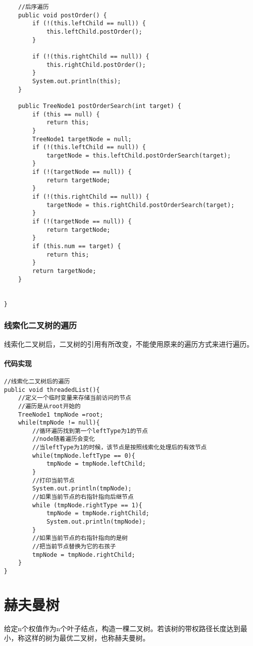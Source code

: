 \documentclass[a4paper]{report}
\begin{document}
\begin{lstlisting}
    //后序遍历
    public void postOrder() {
        if (!(this.leftChild == null)) {
            this.leftChild.postOrder();
        }

        if (!(this.rightChild == null)) {
            this.rightChild.postOrder();
        }
        System.out.println(this);
    }

    public TreeNode1 postOrderSearch(int target) {
        if (this == null) {
            return this;
        }
        TreeNode1 targetNode = null;
        if (!(this.leftChild == null)) {
            targetNode = this.leftChild.postOrderSearch(target);
        }
        if (!(targetNode == null)) {
            return targetNode;
        }
        if (!(this.rightChild == null)) {
            targetNode = this.rightChild.postOrderSearch(target);
        }
        if (!(targetNode == null)) {
            return targetNode;
        }
        if (this.num == target) {
            return this;
        }
        return targetNode;
    }


}
\end{lstlisting}
\subsection{线索化二叉树的遍历}
线索化二叉树后，二叉树的引用有所改变，不能使用原来的遍历方式来进行遍历。
\subsubsection{代码实现}
\begin{lstlisting}
//线索化二叉树后的遍历
public void threadedList(){
    //定义一个临时变量来存储当前访问的节点
    //遍历是从root开始的
    TreeNode1 tmpNode =root;
    while(tmpNode != null){
        //循环遍历找到第一个leftType为1的节点
        //node随着遍历会变化
        //当leftType为1的时候，该节点是按照线索化处理后的有效节点
        while(tmpNode.leftType == 0){
            tmpNode = tmpNode.leftChild;
        }
        //打印当前节点
        System.out.println(tmpNode);
        //如果当前节点的右指针指向后继节点
        while (tmpNode.rightType == 1){
            tmpNode = tmpNode.rightChild;
            System.out.println(tmpNode);
        }
        //如果当前节点的右指针指向的是树
        //把当前节点替换为它的右孩子
        tmpNode = tmpNode.rightChild;
    }
}
\end{lstlisting}
\chapter{赫夫曼树}
给定n个权值作为n个叶子结点，构造一棵二叉树。若该树的带权路径长度达到最小，称这样的树为最优二叉树，也称赫夫曼树。
\end{document}
